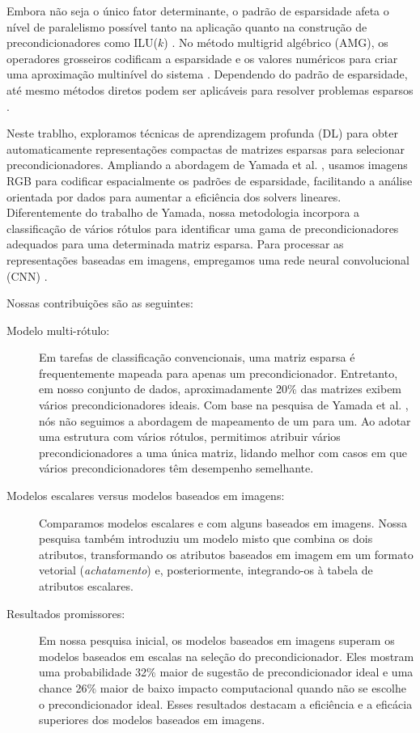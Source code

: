 \documentclass{pssbmac}
\begin{document}
Embora não seja o único fator determinante, o padrão de esparsidade afeta o 
nível de paralelismo possível tanto na aplicação quanto na construção de precondicionadores 
como ILU($k$) \cite{Meijerink1977AnIS, saad2003iterative}. No método multigrid algébrico (AMG),
os operadores grosseiros codificam a esparsidade e os valores numéricos para criar 
uma aproximação multinível do sistema \cite{stuben2001AReview}. Dependendo do padrão 
de esparsidade, até mesmo métodos diretos podem ser aplicáveis para resolver 
problemas esparsos \cite{Davis2016ASO}.

Neste trablho, exploramos técnicas de aprendizagem profunda (DL) para obter 
automaticamente representações compactas de matrizes esparsas para selecionar 
precondicionadores. Ampliando a abordagem de Yamada et al. \cite{yamada2018preconditioner}, 
usamos imagens RGB para codificar espacialmente os padrões de esparsidade, 
facilitando a análise orientada por dados para aumentar a eficiência dos solvers lineares. 
Diferentemente do trabalho de Yamada, nossa metodologia incorpora a classificação 
de vários rótulos para identificar uma gama de precondicionadores adequados 
para uma determinada matriz esparsa. Para processar as representações baseadas 
em imagens, empregamos uma rede neural convolucional (CNN) \cite{li2022survey}.

Nossas contribuições são as seguintes: 
 \begin{description}  
\item [Modelo multi-rótulo:] Em tarefas de classificação convencionais, 
uma matriz esparsa é frequentemente mapeada para apenas um precondicionador. 
Entretanto, em nosso conjunto de dados, aproximadamente 20\% das matrizes exibem 
vários precondicionadores ideais. Com base na pesquisa de Yamada et al.
\cite{yamada2018preconditioner}, nós não seguimos a abordagem de mapeamento de um para um. 
Ao adotar uma estrutura com vários rótulos, permitimos atribuir vários precondicionadores 
a uma única matriz, lidando melhor com casos em que vários precondicionadores têm desempenho 
semelhante.  
\item [Modelos escalares versus modelos baseados em imagens:] Comparamos modelos escalares 
e com alguns baseados em imagens. Nossa pesquisa também introduziu um modelo misto que combina 
os dois atributos, transformando os atributos baseados em imagem em um formato 
vetorial (\emph{achatamento}) e, posteriormente, integrando-os à tabela de atributos escalares.  
\item[Resultados promissores:] Em nossa pesquisa inicial, os modelos baseados em imagens 
superam os modelos baseados em escalas na seleção do precondicionador. Eles mostram 
uma probabilidade 32\% maior de sugestão de precondicionador ideal e uma chance 26\% maior 
de baixo impacto computacional quando não se escolhe o precondicionador ideal. Esses 
resultados destacam a eficiência e a eficácia superiores dos modelos baseados em imagens.  
\end{description}
\end{document}
